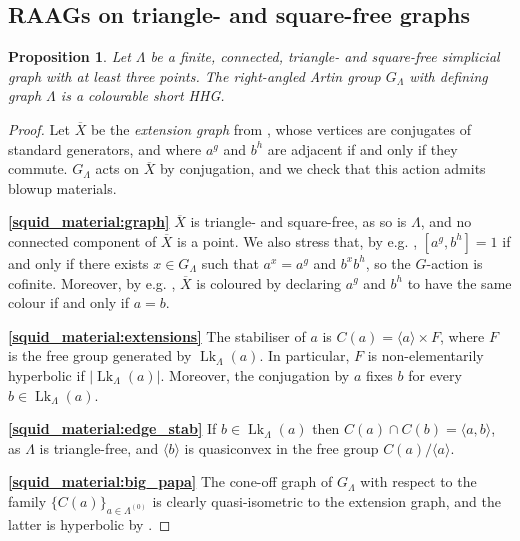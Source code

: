 \documentclass[svgnames]{amsart}
\theoremstyle{plain}
\newtheorem{prop}[thm]{Proposition}
\theoremstyle{definition}
\newcommand{\ov}[1]{\overline{#1}}
\newcommand{\link}{\operatorname{Lk}}
\begin{document}
\subsection{RAAGs on triangle- and square-free graphs}\label{subsec:new_raags}
\begin{prop}\label{prop:raag_short}
    Let $\Lambda$ be a finite, connected, triangle- and square-free simplicial graph with at least three points. The right-angled Artin group $G_\Lambda$ with defining graph $\Lambda$ is a colourable short HHG. 
\end{prop}

\begin{proof} Let $\ov X$ be the \emph{extension graph} from \cite{kim_koberda}, whose vertices are conjugates of standard generators, and where $a^g$ and $b^h$ are adjacent if and only if they commute. $G_\Lambda$ acts on $\ov X$ by conjugation, and we check that this action admits blowup materials.
\par\medskip
\textbf{\eqref{squid_material:graph}} $\ov X$ is triangle- and square-free, as so is $\Lambda$, and no connected component of $\ov X$ is a point. We also stress that, by e.g. \cite[Theorem 15]{kim_koberda_embeddability}, $[a^g,b^h]=1$ if and only if there exists $x\in G_\Lambda$ such that $a^x=a^g$ and $b^xb^h$, so the $G$-action is cofinite. Moreover, by e.g. \cite[Lemma 26.(8)]{kim_koberda_embeddability}, $\ov X$ is coloured by declaring $a^g$ and $b^h$ to have the same colour if and only if $a=b$.

\par\medskip
\textbf{\eqref{squid_material:extensions}} The stabiliser of $a$ is $C(a)=\langle a\rangle \times F$, where $F$ is the free group generated by $\link_{\Lambda}(a)$. In particular, $F$ is non-elementarily hyperbolic if $|\link_{\Lambda}(a)|$. Moreover, the conjugation by $a$ fixes $b$ for every $b\in\link_{\Lambda}(a)$.

\par\medskip
\textbf{\eqref{squid_material:edge_stab}} If $b\in\link_{\Lambda}(a)$ then $C(a)\cap C(b)=\langle a,b\rangle$, as $\Lambda$ is triangle-free, and $\langle b\rangle$ is quasiconvex in the free group $C(a)/\langle a\rangle$.

\par\medskip
\textbf{\eqref{squid_material:big_papa}} The cone-off graph of $G_\Lambda$ with respect to the family $\{C(a)\}_{a\in \Lambda^{(0)}}$ is clearly quasi-isometric to the extension graph, and the latter is hyperbolic by \cite{kim_koberda_embeddability}.


\end{proof}
\end{document}
